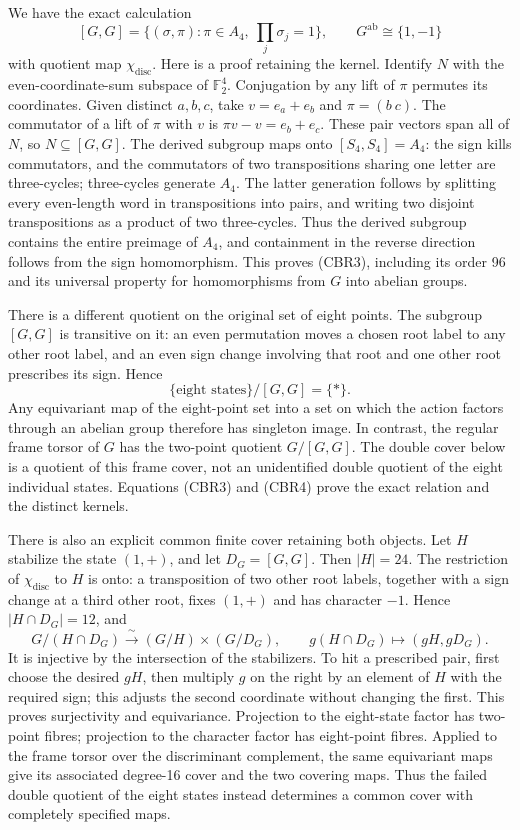 \documentclass[
  10pt,
  a4paper,
]{article}
\begin{document}
We have the exact calculation \[
[G,G]=\{(\sigma,\pi):\pi\in A_4,\ \prod_j\sigma_j=1\},
\qquad G^{\mathrm{ab}}\cong\{1,-1\}
\tag{CBR3}
\] with quotient map \(\chi_{\mathrm{disc}}\). Here is a proof retaining
the kernel. Identify \(N\) with the even-coordinate-sum subspace of
\(\mathbb F_2^4\). Conjugation by any lift of \(\pi\) permutes its
coordinates. Given distinct \(a,b,c\), take \(v=e_a+e_b\) and
\(\pi=(b\ c)\). The commutator of a lift of \(\pi\) with \(v\) is
\(\pi v-v=e_b+e_c\). These pair vectors span all of \(N\), so
\(N\subseteq[G,G]\). The derived subgroup maps onto \([S_4,S_4]=A_4\):
the sign kills commutators, and the commutators of two transpositions
sharing one letter are three-cycles; three-cycles generate \(A_4\). The
latter generation follows by splitting every even-length word in
transpositions into pairs, and writing two disjoint transpositions as a
product of two three-cycles. Thus the derived subgroup contains the
entire preimage of \(A_4\), and containment in the reverse direction
follows from the sign homomorphism. This proves (CBR3), including its
order 96 and its universal property for homomorphisms from \(G\) into
abelian groups.

There is a different quotient on the original set of eight points. The
subgroup \([G,G]\) is transitive on it: an even permutation moves a
chosen root label to any other root label, and an even sign change
involving that root and one other root prescribes its sign. Hence \[
\{\text{eight states}\}/[G,G]=\{*\}.
\tag{CBR4}
\] Any equivariant map of the eight-point set into a set on which the
action factors through an abelian group therefore has singleton image.
In contrast, the regular frame torsor of \(G\) has the two-point
quotient \(G/[G,G]\). The double cover below is a quotient of this frame
cover, not an unidentified double quotient of the eight individual
states. Equations (CBR3) and (CBR4) prove the exact relation and the
distinct kernels.

There is also an explicit common finite cover retaining both objects.
Let \(H\) stabilize the state \((1,+)\), and let \(D_G=[G,G]\). Then
\(|H|=24\). The restriction of \(\chi_{\mathrm{disc}}\) to \(H\) is
onto: a transposition of two other root labels, together with a sign
change at a third other root, fixes \((1,+)\) and has character \(-1\).
Hence \(|H\cap D_G|=12\), and \[
G/(H\cap D_G)\xrightarrow{\ \sim\ }
(G/H)\times(G/D_G),\qquad
g(H\cap D_G)\longmapsto(gH,gD_G).
\tag{CBR4a}
\] It is injective by the intersection of the stabilizers. To hit a
prescribed pair, first choose the desired \(gH\), then multiply \(g\) on
the right by an element of \(H\) with the required sign; this adjusts
the second coordinate without changing the first. This proves
surjectivity and equivariance. Projection to the eight-state factor has
two-point fibres; projection to the character factor has eight-point
fibres. Applied to the frame torsor over the discriminant complement,
the same equivariant maps give its associated degree-16 cover and the
two covering maps. Thus the failed double quotient of the eight states
instead determines a common cover with completely specified maps.
\end{document}
